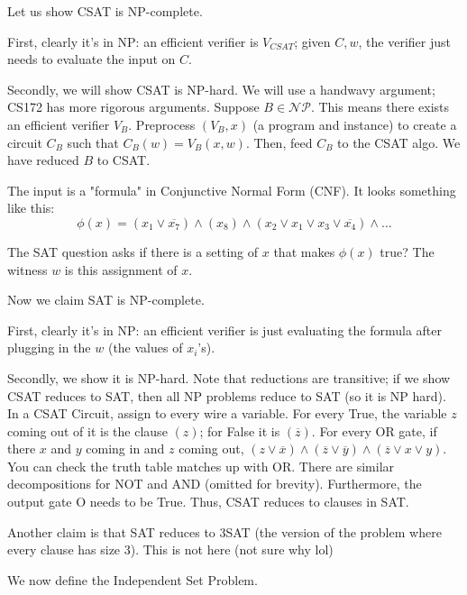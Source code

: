 Let us show CSAT is NP-complete.
\begin{proof*}
    First, clearly it's in NP:
    an efficient verifier is $V_{CSAT}$; given $C, w$, the verifier just needs to evaluate the input on $C$.
    
    Secondly, we will show CSAT is NP-hard. We will use a handwavy argument; CS172 has more rigorous arguments.
    Suppose $B \in \mathcal{NP}$. This means there exists an efficient verifier $V_B$. Preprocess $(V_B, x)$ (a program and instance) to
    create a circuit $C_B$ such that $C_B(w) = V_B(x, w)$. Then, feed $C_B$ to the CSAT algo. We have reduced $B$ to CSAT.
\end{proof*}

\begin{definition}[SAT]
    The input is a "formula" in Conjunctive Normal Form (CNF). It looks something like this:
    \[ \phi(x) = (x_1 \lor \overline{x_7}) \land (x_8) \land (x_2 \lor x_1 \lor x_3 \lor \overline{x_4}) \land \dots \]
    
    The SAT question asks if there is a setting of $x$ that makes $\phi(x)$ true? The witness $w$ is this assignment of $x$.
\end{definition}

Now we claim SAT is NP-complete.

\begin{proof*}
    First, clearly it's in NP: an efficient verifier is just evaluating the formula after plugging in the $w$ (the values of $x_i$'s).

    Secondly, we show it is NP-hard. Note that reductions are transitive; if we show CSAT reduces to SAT, then all NP problems reduce to SAT (so it is NP hard).
    In a CSAT Circuit, assign to every wire a variable. For every True, the variable $z$ coming out of it is the clause $(z)$; for False it is $(\overline{z})$.
    For every OR gate, if there $x$ and $y$ coming in and $z$ coming out, $(z \lor \overline{x}) \land (\overline{z} \lor \overline{y}) \land (\overline{z} \lor x \lor y)$. You can check the truth
    table matches up with OR. There are similar decompositions for NOT and AND (omitted for brevity). Furthermore, the output gate O needs to be True. Thus, CSAT reduces to clauses in SAT.
\end{proof*}

Another claim is that SAT reduces to 3SAT (the version of the problem where every clause has size 3). This is not here (not sure why lol)

We now define the Independent Set Problem.

